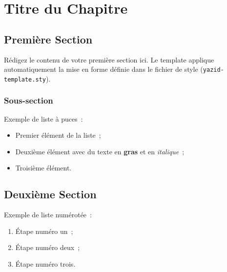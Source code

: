 
\chapter{Titre du Chapitre}
\sloppy  %

\section{Première Section}

Rédigez le contenu de votre première section ici. Le template applique
automatiquement la mise en forme définie dans le fichier de style
(\texttt{yazid-template.sty}).

\subsection{Sous-section}

Exemple de liste à puces~:

\begin{itemize}

    \item Premier élément de la liste~;

    \item Deuxième élément avec du texte en \textbf{gras} et en
          \textit{italique}~;

    \item Troisième élément.

\end{itemize}

\section{Deuxième Section}

Exemple de liste numérotée~:

\begin{enumerate}

    \item Étape numéro un~;

    \item Étape numéro deux~;

    \item Étape numéro trois.

\end{enumerate}

